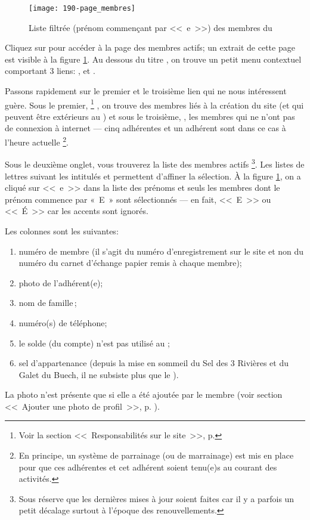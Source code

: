 

\begin{figure}
    \texttt{[image: 190-page\_membres]}
    \caption[Liste filtrée des membres du \CdS]{Liste filtrée (prénom commençant par <<~e~>>) des membres du \CdS}
    \label{fig:pageMembres}
\end{figure}
Cliquez sur  pour accéder à la page des membres actifs; un extrait de cette page est visible à la figure \ref{fig:pageMembres}. Au dessous du titre , on trouve un petit menu contextuel comportant 3 liens: ,  et .

Passons rapidement sur le premier et le troisième lien qui ne nous intéressent guère. Sous le premier, %
\footnote{Voir la section <<~Responsabilités sur le site~>>, p. \pageref{sec:responsabilitesSite} }
, on trouve des membres liés à la création du site (et qui peuvent être extérieurs au \sel) et sous le troisième, , les membres qui ne n’ont pas de connexion à internet --- cinq adhérentes et un adhérent sont dans ce cas à l’heure actuelle%
\footnote{En principe, un système de parrainage (ou de marrainage) est mis en place pour que ces adhérentes et cet adhérent soient tenu(e)s au courant des activités.}.

Sous le deuxième onglet, vous trouverez la liste des membres actifs%
\footnote{Sous réserve que les dernières mises à jour soient faites car il  y a parfois un petit décalage surtout à l’époque des renouvellements.}.
Les listes de lettres suivant les intitulés  et  permettent d’affiner la sélection. À la figure \ref{fig:pageMembres}, on a cliqué sur <<~e~>> dans la liste des prénoms et seuls les membres dont le prénom commence par «~E~» sont sélectionnés --- en fait,  <<~E~>> ou <<~É~>> car les accents sont ignorés.

Les colonnes sont les suivantes: 
\begin{enumerate}
    \item numéro de membre (il s’agit du numéro d’enregistrement sur le site et non du numéro du carnet d’échange papier remis à chaque membre);
    \item photo de l’adhérent(e);
    \item nom de famille\,;
    \item numéro(s) de téléphone;
    \item le solde (du compte) n’est pas utilisé au \CdS;
    \item sel d’appartenance (depuis la mise en sommeil du Sel des 3 Rivières et du Galet du Buech, il ne subsiste plus que le \CdS).
\end{enumerate}
La photo n'est présente que si elle a été ajoutée par le membre (voir section <<~Ajouter une photo de profil~>>, p. \pageref{sec:insererImage}).

